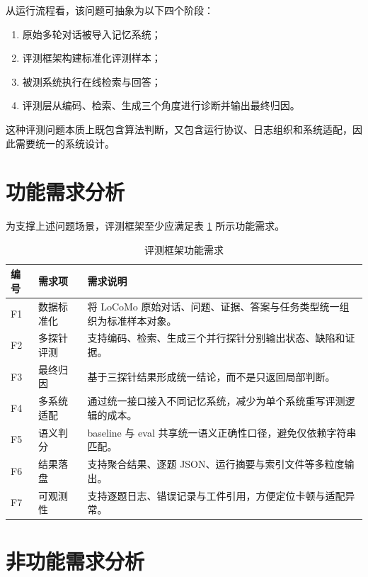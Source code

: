 从运行流程看，该问题可抽象为以下四个阶段：

\begin{enumerate}
    \item 原始多轮对话被导入记忆系统；
    \item 评测框架构建标准化评测样本；
    \item 被测系统执行在线检索与回答；
    \item 评测层从编码、检索、生成三个角度进行诊断并输出最终归因。
\end{enumerate}

这种评测问题本质上既包含算法判断，又包含运行协议、日志组织和系统适配，因此需要统一的系统设计。

\section{功能需求分析}

为支撑上述问题场景，评测框架至少应满足表 \ref{tab:function-req} 所示功能需求。

\begin{table}[htbp]
\centering
\caption{评测框架功能需求}
\label{tab:function-req}
\begin{tabular}{p{}p{}p{}}
\toprule
编号 & 需求项 & 需求说明 \\
\midrule
F1 & 数据标准化 & 将 LoCoMo 原始对话、问题、证据、答案与任务类型统一组织为标准样本对象。 \\
F2 & 多探针评测 & 支持编码、检索、生成三个并行探针分别输出状态、缺陷和证据。 \\
F3 & 最终归因 & 基于三探针结果形成统一结论，而不是只返回局部判断。 \\
F4 & 多系统适配 & 通过统一接口接入不同记忆系统，减少为单个系统重写评测逻辑的成本。 \\
F5 & 语义判分 & baseline 与 eval 共享统一语义正确性口径，避免仅依赖字符串匹配。 \\
F6 & 结果落盘 & 支持聚合结果、逐题 JSON、运行摘要与索引文件等多粒度输出。 \\
F7 & 可观测性 & 支持逐题日志、错误记录与工件引用，方便定位卡顿与适配异常。 \\
\bottomrule
\end{tabular}
\end{table}

\section{非功能需求分析}

